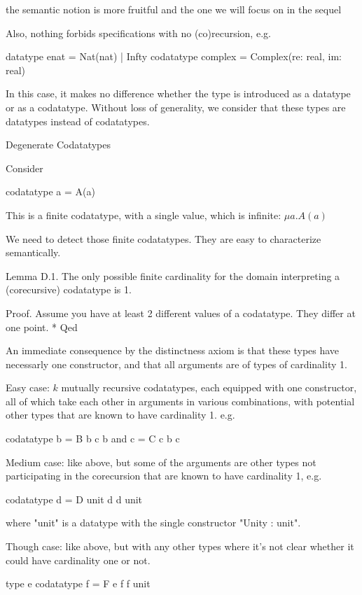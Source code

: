 \documentclass[a4paper,oribibl,envcountsame,draft]{llncs}
\begin{document}
    the semantic notion is more fruitful and the one we will focus on in the
    sequel

    Also, nothing forbids specifications with no (co)recursion, e.g.

      datatype enat = Nat(nat) | Infty
      codatatype complex = Complex(re: real, im: real)

    In this case, it makes no difference whether the type is introduced as a
    datatype or as a codatatype. Without loss of generality, we consider that
    these types are datatypes instead of codatatypes.


Degenerate Codatatypes

    Consider

      codatatype a = A(a)

    This is a finite codatatype, with a single value, which is infinite:
    $\mu a. A(a)$
    
    We need to detect those finite codatatypes. They are easy to
    characterize semantically.

    Lemma D.1. The only possible finite cardinality for the domain interpreting
    a (corecursive) codatatype is 1.

    Proof.
      Assume you have at least 2 different values of a codatatype.
      They differ at one point.
      * 
    Qed

    An immediate consequence by the distinctness axiom is that these types have
    necessarly one constructor, and that all arguments are of types of
    cardinality 1.

    Easy case: $k$ mutually recursive codatatypes, each equipped with one
    constructor, all of which take each other in arguments in various
    combinations, with potential other types that are known to have cardinality
    1. e.g.

      codatatype b = B b c b
             and c = C c b c

    Medium case: like above, but some of the arguments are other types not
    participating in the corecursion that are known to have cardinality 1, e.g.

      codatatype d = D unit d d unit

    where "unit" is a datatype with the single constructor "Unity : unit".

    Though case: like above, but with any other types where it's not clear
    whether it could have cardinality one or not.

      type e
      codatatype f = F e f f unit
\end{document}
